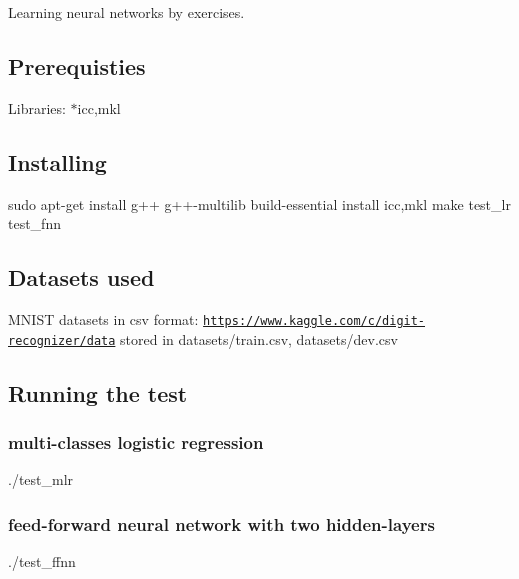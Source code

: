 Learning neural networks by exercises.

\subsection*{Prerequisties}

Libraries\+: $\ast$icc,mkl

\subsection*{Installing}

sudo apt-\/get install g++ g++-\/multilib build-\/essential install icc,mkl make test\+\_\+lr test\+\_\+fnn

\subsection*{Datasets used}

M\+N\+I\+ST datasets in csv format\+: \href{https://www.kaggle.com/c/digit-recognizer/data}{\tt https\+://www.\+kaggle.\+com/c/digit-\/recognizer/data} stored in datasets/train.\+csv, datasets/dev.\+csv

\subsection*{Running the test}

\subsubsection*{multi-\/classes logistic regression}

./test\+\_\+mlr

\subsubsection*{feed-\/forward neural network with two hidden-\/layers}

./test\+\_\+ffnn 